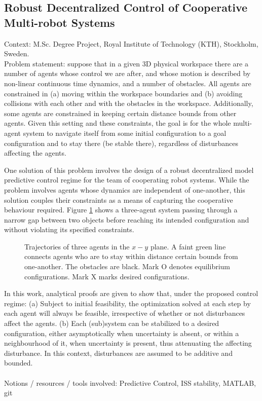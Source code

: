 \subsection{Robust Decentralized Control of Cooperative Multi-robot Systems}

Context: M.Sc. Degree Project, Royal Institute of Technology (KTH), Stockholm, Sweden.\\

Problem statement: suppose that in a given 3D physical workspace there are
a number of agents whose control we are after, and whose motion is described by
non-linear continuous time dynamics, and a number of obstacles. All agents are
constrained in (a) moving within the workspace boundaries and (b) avoiding
collisions with each other and with the obstacles in the workspace.
Additionally, some agents are constrained in keeping certain distance bounds
from other agents. Given this setting and these constraints, the goal is for the
whole multi-agent system to navigate itself from some initial configuration to
a goal configuration and to stay there (be stable there), regardless of
disturbances affecting the agents.

One solution of this problem involves the design of a robust decentralized model
predictive control regime for the team of cooperating robot systems. While the
problem involves agents whose dynamics are independent of one-another, this solution
couples their constraints as a means of capturing the cooperative behaviour required.
Figure \ref{fig:d_OFF_res_trajectory_3_2} shows a three-agent system passing
through a narrow gap between two objects before reaching its intended
configuration and without violating its specified constraints.

\begin{figure}[H]\centering
  \scalebox{0.8}{}
  \caption{Trajectories of three agents in the $x-y$ plane. A faint green line
    connects agents who are to stay within distance certain bounds from
    one-another. The obstacles are black. Mark O denotes equilibrium
    configurations. Mark X marks desired configurations.}
  \label{fig:d_OFF_res_trajectory_3_2}
\end{figure}

In this work, analytical proofs are given to show that, under the proposed
control regime: (a) Subject to initial feasibility, the optimization solved at
each step by each agent will always be feasible, irrespective of whether or not
disturbances affect the agents. (b) Each (sub)system can be stabilized to a
desired configuration, either asymptotically when uncertainty is absent,
or within a neighbourhood of it, when uncertainty is present, thus attenuating
the affecting disturbance. In this context, disturbances are assumed to be
additive and bounded.\\\\
Notions / resources / tools involved: Predictive Control, ISS stability, MATLAB, git

